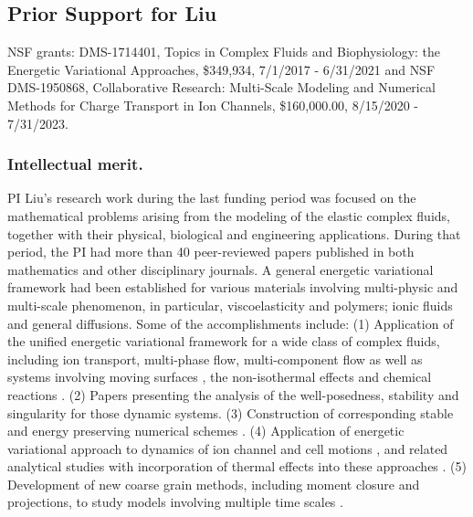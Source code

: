 \documentclass[11pt]{NSFamsart}
\begin{document}
 

\subsection*{Prior Support for Liu} NSF grants: DMS-1714401,  Topics in Complex Fluids and Biophysiology: the Energetic Variational Approaches, \$349,934, 7/1/2017 - 6/31/2021 and 
{NSF DMS-1950868, Collaborative Research: Multi-Scale Modeling and Numerical Methods for Charge Transport in Ion Channels, \$160,000.00, 8/15/2020 - 7/31/2023.}

 \subsubsection*{Intellectual merit.}  
PI Liu's research work during the last funding period was focused on the mathematical problems
arising from the modeling of the elastic complex fluids, together
with their physical, biological and engineering applications.
During that period, the PI had more than 40 peer-reviewed papers published in both mathematics and  other disciplinary journals. A general energetic variational framework had been established for various materials
involving multi-physic and multi-scale phenomenon,  in particular, viscoelasticity and polymers;  ionic fluids and general diffusions.
Some of the accomplishments include: (1) Application of the unified energetic variational framework for a wide class of complex fluids, including ion transport, multi-phase flow,
multi-component flow as well as systems involving moving  surfaces \cite{HuLiLi18,
yang_thermodynamically_2018,benesova_existence_2018, deng_largest_2017,xu_strong_2017,benesova_existence_2018,liu_energetic_2019, Kirshtein2020}, the non-isothermal effects \cite{de2019non,liu2018non, hsieh2020global, Jan-Eric}
and chemical reactions \cite{terebus2018discrete, wang2020field}. 
(2) Papers \cite{liu_energetic_2019, epshteyn2019large, Jan-Eric, hsieh2020global} presenting the analysis of the well-posedness, stability and singularity
for those dynamic systems. (3) Construction of corresponding stable and energy preserving numerical schemes \cite{duan_numerical_2019,xu_numerical_2019,duan_numerical_2019-2, wu2019energetic, liu2020lagrangian, liu2020variational, liu2020structure,duan2020structure}.
 (4)  Application of energetic variational approach to dynamics of ion channel and cell motions \cite{horng_continuum_2019,gavish_bistable_2018, liu_generalized_2017},
and related analytical studies \cite{WaLiTa17, hsieh2020global} with incorporation of thermal effects into these approaches \cite{liu2018non, wu2019energetic, hsieh2020global}.  (5) Development of new coarse grain  methods, including moment closure and projections, to study models involving multiple time scales
\cite{ma_fluctuation-dissipation_2017,ma_coarse-graining_2019}.
\end{document}
